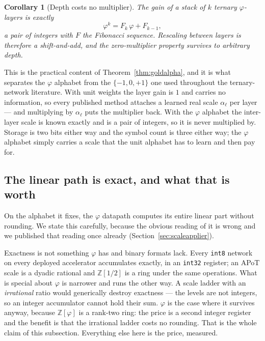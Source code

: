 \documentclass[11pt]{article}
\newtheorem{corollary}{Corollary}
\theoremstyle{definition}
\begin{document}
\begin{corollary}[Depth costs no multiplier]
\label{cor:depth}
The gain of a stack of $k$ ternary $\varphi$-layers is exactly
\[
  \varphi^{k} = F_k\,\varphi + F_{k-1},
\]
a pair of integers with $F$ the Fibonacci sequence. Rescaling between layers is
therefore a shift-and-add, and the zero-multiplier property survives to arbitrary
depth.
\end{corollary}

This is the practical content of Theorem~\ref{thm:goldalpha}, and it is what
separates the $\varphi$ alphabet from the $\{-1,0,+1\}$ one used throughout the
ternary-network literature. With unit weights the layer gain is $1$ and carries no
information, so every published method attaches a learned real scale $\alpha_\ell$
per layer --- and multiplying by $\alpha_\ell$ puts the multiplier back. With the
$\varphi$ alphabet the inter-layer scale is known exactly and is a pair of
integers, so it is never multiplied by. Storage is two bits either way and the
symbol count is three either way; the $\varphi$ alphabet simply carries a scale
that the unit alphabet has to learn and then pay for.


\subsection{The linear path is exact, and what that is worth}
\label{sec:exact}

On the alphabet it fixes, the $\varphi$ datapath computes its entire linear part
without rounding. We state this carefully, because the obvious reading of it is
wrong and we published that reading once already
(Section~\ref{sec:scaleapplier}).

Exactness is not something $\varphi$ has and binary formats lack. Every
\texttt{int8} network on every deployed accelerator accumulates exactly, in an
\texttt{int32} register; an APoT scale is a dyadic rational and $\mathbb{Z}[1/2]$
is a ring under the same operations. What is special about $\varphi$ is
narrower and runs the other way. A scale ladder with an \emph{irrational} ratio
would generically destroy exactness --- the levels are not integers, so an
integer accumulator cannot hold their sum. $\varphi$ is the case where it
survives anyway, because $\mathbb{Z}[\varphi]$ is a rank-two ring: the price is a
second integer register and the benefit is that the irrational ladder costs no
rounding. That is the whole claim of this subsection. Everything else here is
the price, measured.
\end{document}
